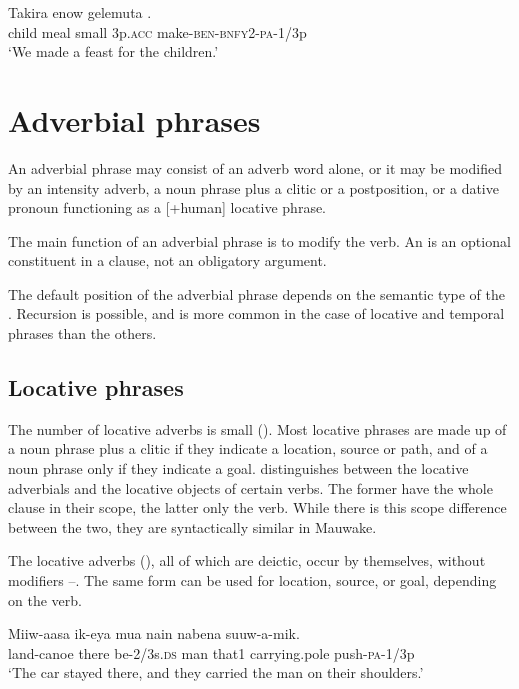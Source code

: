 \ea%
\label{ex:4:x851}
\gll Takira  enow  gelemuta   . \\
   child  meal  small  3p.\textsc{acc}  make-\textsc{ben}-\textsc{bnfy}2-\textsc{pa}-1/3p   \\
\glt`We made a feast for the children.'
\z

\section{Adverbial phrases} \label{sec:4.6}
{}
An adverbial phrase may consist of an adverb word alone, or it may be modified by an intensity adverb, a noun phrase plus a clitic or a postposition, or a dative pronoun functioning as a [+human] locative phrase.

The main function of an adverbial phrase is to modify the verb. An  is an optional constituent in a clause, not an obligatory argument. 

The default position of the adverbial phrase depends on the semantic type of the . Recursion is possible, and is more common in the case of locative and temporal phrases than the others.

\subsection{Locative phrases} \label{sec:4.6.1}
{}
The number of locative adverbs is small (). Most locative phrases are made up of a noun phrase plus a clitic if they indicate a location, source or path, and of a noun phrase only if they indicate a goal. \citet[78, 110--112]{Givon1984} distinguishes between the locative adverbials and the locative objects of certain verbs. The former have the whole clause in their scope, the latter only the verb. While there is this scope difference between the two, they are syntactically similar in Mauwake. 

The locative adverbs (), all of which are deictic, occur by themselves, without modifiers --. The same form can be used for location, source, or goal, depending on the verb.

\ea%
\label{ex:4:x870}
\gll Miiw-aasa    ik-eya  mua  nain  nabena  suuw-a-mik. \\
   land-canoe  there  be-2/3s.\textsc{ds}  man  that1  carrying.pole  push-\textsc{pa}-1/3p   \\
\glt`The car stayed there, and they carried the man on their shoulders.'
\z

